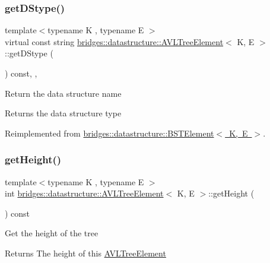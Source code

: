 \subsubsection{\texorpdfstring{getDStype()}{getDStype()}}
{\footnotesize\ttfamily template$<$typename K , typename E $>$ \\
virtual const string \mbox{\hyperlink{classbridges_1_1datastructure_1_1_a_v_l_tree_element}{bridges\+::datastructure\+::\+A\+V\+L\+Tree\+Element}}$<$ K, E $>$\+::get\+D\+Stype (\begin{DoxyParamCaption}{ }\end{DoxyParamCaption}) const\hspace{0.3cm}{\ttfamily [inline]}, {\ttfamily [override]}, {\ttfamily [virtual]}}

Return the data structure name \begin{DoxyReturn}{Returns}
the data structure type 
\end{DoxyReturn}


Reimplemented from \mbox{\hyperlink{classbridges_1_1datastructure_1_1_b_s_t_element_a2bb8cc9ec4b6bc5b89ecef0f17be366f}{bridges\+::datastructure\+::\+B\+S\+T\+Element$<$ K, E $>$}}.

\mbox{\label{classbridges_1_1datastructure_1_1_a_v_l_tree_element_a5d4b990d49f6f3d2f23f4dd3e57414e8}} 
\subsubsection{\texorpdfstring{getHeight()}{getHeight()}}
{\footnotesize\ttfamily template$<$typename K , typename E $>$ \\
int \mbox{\hyperlink{classbridges_1_1datastructure_1_1_a_v_l_tree_element}{bridges\+::datastructure\+::\+A\+V\+L\+Tree\+Element}}$<$ K, E $>$\+::get\+Height (\begin{DoxyParamCaption}{ }\end{DoxyParamCaption}) const\hspace{0.3cm}{\ttfamily [inline]}}

Get the height of the tree \begin{DoxyReturn}{Returns}
The height of this \mbox{\hyperlink{classbridges_1_1datastructure_1_1_a_v_l_tree_element}{A\+V\+L\+Tree\+Element}} 
\end{DoxyReturn}
\mbox{\label{classbridges_1_1datastructure_1_1_a_v_l_tree_element_ab05925e343b9fa71b61c71e8034e1293}} 
